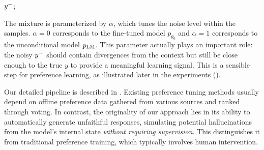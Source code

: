 \begin{algorithm}[ht]
\small
\caption{$\mathtt{noisy\_generation}(c, p_\mathrm{LM}, p_{\theta_0})$}
\label{alg:preferencedatasetgen}

\BlankLine
\Return $y^-$;
\end{algorithm}



The mixture is parameterized by $\alpha$, which tunes the noise level within the samples. $\alpha = 0$ corresponds to the fine-tuned model $p_{\theta_0}$ and $\alpha = 1$ corresponds to the unconditional model $p_{\text{LM}}$.  
This parameter actually plays an important role:  the noisy $y^-$ should contain divergences from the context but still be close enough to the true $y$ to provide a meaningful learning signal. This is a sensible step for preference learning, as illustrated later in the experiments ().


Our detailed pipeline is described in . 
Existing preference tuning methods usually depend on offline preference data gathered from various sources and ranked through voting. In contrast, the originality of our approach lies in its ability to automatically generate unfaithful responses, simulating potential hallucinations from the model's internal state \emph{without requiring supervision}. This distinguishes it from traditional preference training, which typically involves human intervention.


